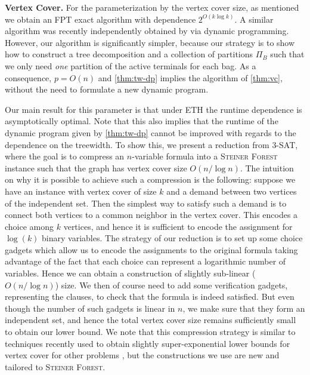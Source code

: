 \documentclass[a4paper]{article}
\let\oldcitet\citet
\renewcommand{\citet}[1]{\mbox{\oldcitet{#1}}}
\theoremstyle{plain}
\newcommand{\pname}[1]{\textsc{#1}}
\newcommand{\SF}{\pname{Steiner Forest}\xspace}
\begin{document}
\smallskip
\textbf{Vertex Cover.} For the parameterization by the vertex cover size, as
mentioned we obtain an FPT exact algorithm with dependence $2^{O(k\log k)}$. A
similar algorithm was recently independently obtained by
\citet{bodlaender2023complexity} via dynamic programming. However, our
algorithm is significantly simpler, because our strategy is to show how to
construct a tree decomposition and a collection of partitions $\Pi_B$ such that
we only need \emph{one} partition of the active terminals for each bag. As a
consequence, $p=O(n)$ and \autoref{thm:tw-dp} implies the algorithm of
\autoref{thm:vc}, without the need to formulate a new dynamic program.

Our main result for this parameter is that under ETH the runtime dependence
is asymptotically optimal. Note that this also implies that the runtime of the dynamic program
given by \autoref{thm:tw-dp} cannot be improved with regards to the dependence
on the treewidth. To show this, we present a reduction from \textsc{3-SAT}, where the
goal is to compress an $n$-variable formula into a \SF
instance such that the graph has vertex cover size $O(n/\log n)$. The intuition on why
it is possible to achieve such a compression is the following: suppose we have
an instance with vertex cover of size $k$ and a demand between two vertices of
the independent set. Then the simplest way to satisfy such a demand is to
connect both vertices to a common neighbor in the vertex cover. This encodes a
choice among $k$ vertices, and hence it is sufficient to encode the assignment for
$\log(k)$ binary variables. The strategy of our reduction is to set up some
choice gadgets which allow us to encode the assignments to the original formula
taking advantage of the fact that each choice can represent a logarithmic
number of variables. Hence we can obtain a construction of slightly sub-linear
($O(n/\log n)$) size.  We then of course need to add some verification gadgets,
representing the clauses, to check that the formula is indeed satisfied. But
even though the number of such gadgets is linear in $n$, we make sure that they
form an independent set, and hence the total vertex cover size remains
sufficiently small to obtain our lower bound. We note that this compression
strategy is similar to techniques recently used to obtain slightly
super-exponential lower bounds for vertex cover for other problems
\cite{LampisMV23,LampisV23}, but the constructions we use are new and tailored to
\SF.
\end{document}
